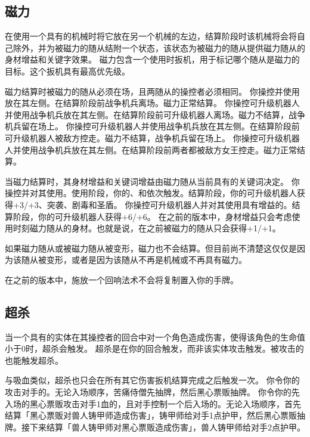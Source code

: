 \subsection{磁力}
\label{magentic}

在使用一个具有的机械时将它放在另一个机械的左边，结算阶段时该机械将会将自己除外，并为被磁力的随从结附一个状态，该状态为被磁力的随从提供磁力随从的身材增益和关键字效果。
\notice 磁力包含一个使用时扳机，用于标记哪个随从是磁力的目标。这个扳机具有最高优先级。

磁力结算时被磁力的随从必须在场，且两随从的操控者必须相同。
\example 你操控并使用放在其左侧。在结算阶段前战争机兵离场。磁力正常结算。
\example 你操控可升级机器人并使用战争机兵放在其左侧。在结算阶段前可升级机器人离场。磁力不结算，战争机兵留在场上。
\example 你操控可升级机器人并使用战争机兵放在其左侧。在结算阶段前可升级机器人被敌方控走。磁力不结算，战争机兵留在场上。
\example 你操控可升级机器人并使用战争机兵放在其左侧。在结算阶段前两者都被敌方女王控走。磁力正常结算。

当磁力结算时，其身材增益和关键词增益由磁力随从当前具有的关键词决定。
\example 你操控并对其使用。使用阶段，你的、和依次触发。结算阶段，你的可升级机器人获得+3/+3、突袭、剧毒和圣盾。
\example 你操控可升级机器人并对其使用具有增益的。结算阶段，你的可升级机器人获得+6/+6。
\notice {}在之前的版本中，身材增益只会考虑使用时刻磁力随从的身材。也就是说，在之前被磁力的随从只会获得+1/+1。

如果磁力随从或被磁力随从被变形，磁力也不会结算。但目前尚不清楚这仅仅是因为该随从被变形，或者是因为该随从不再是机械或不再具有磁力。

 在之前的版本中，施放一个回响法术不会将复制置入你的手牌。

\subsection{超杀}
\label{overkill}

当一个具有的实体在其操控者的回合中对一个角色造成伤害，使得该角色的生命值小于0时，超杀会触发。
\notice 超杀是在你的回合触发，而非该实体攻击触发。被攻击的也能触发超杀。

与吸血类似，超杀也只会在所有其它伤害扳机结算完成之后触发一次。
\example 你令你的攻击对手的。无论入场顺序，苦痛侍僧先抽牌，然后黑心票贩抽牌。
\example 你令你的先入场的黑心票贩攻击对手1血的，且对手控制一个后入场的。无论入场顺序，首先结算「黑心票贩对兽人铸甲师造成伤害」，铸甲师给对手1点护甲，然后黑心票贩抽牌。接下来结算「兽人铸甲师对黑心票贩造成伤害」，兽人铸甲师给对手2点护甲。

